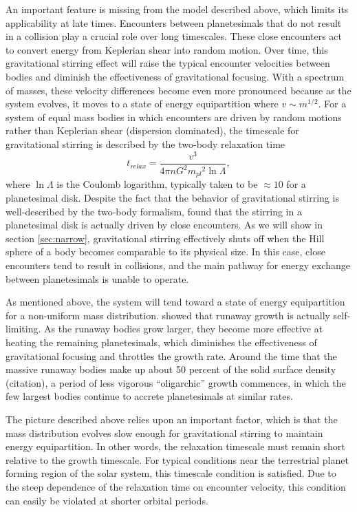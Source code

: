 \documentclass[twocolumn]{aastex63}
\begin{document}
An important feature is missing from the model described above, which
limits its applicability at late times. Encounters between
planetesimals that do not result in a collision play a crucial role
over long timescales. These close encounters act to convert energy
from Keplerian shear into random motion. Over time, this gravitational
stirring effect will raise the typical encounter velocities between
bodies and diminish the effectiveness of gravitational focusing. With
a spectrum of masses, these velocity differences become even more
pronounced because as the system evolves, it moves to a state of
energy equipartition where $v \sim m^{1/2}$. For a system of equal mass bodies in which encounters are driven by random motions rather than Keplerian shear (dispersion dominated), the timescale for gravitational stirring is described by the two-body relaxation time \citep{ida93}
\begin{equation}\label{eq:relax}
	t_{relax} = \frac{v^3}{4 \pi n G^2 {m_{pl}}^2 \ln \Lambda},
\end{equation}
where $\ln \Lambda$ is the Coulomb logarithm,
typically taken to be $\approx 10$ for a planetesimal disk. Despite
the fact that the behavior of gravitational stirring is well-described
by the two-body formalism, \citep{ida93} found that the stirring in a planetesimal disk is actually driven by close encounters. As we will show in section \ref{sec:narrow}, gravitational stirring effectively shuts off when the Hill sphere of a body becomes comparable to its physical size. In this case, close encounters tend to result in collisions, and the main pathway for energy exchange between planetesimals is unable to operate.

As mentioned above, the system will tend toward a state of energy
equipartition for a non-uniform mass distribution. \citet{kokubo98}
showed that runaway growth is actually self-limiting. As the runaway
bodies grow larger, they become more effective at heating the
remaining planetesimals, which diminishes the effectiveness of
gravitational focusing and throttles the growth rate. Around the time
that the massive runaway bodies make up about 50 percent of the solid
surface density
(citation), a period of less vigorous ``oligarchic'' growth commences, in which the few largest bodies continue to accrete planetesimals at similar rates.

The picture described above relies upon an important factor, which is that the mass distribution evolves slow enough for gravitational stirring to maintain energy equipartition. In other words, the relaxation timescale must remain short relative to the growth timescale. For typical conditions near the terrestrial planet forming region of the solar system, this timescale condition is satisfied. Due to the steep dependence of the relaxation time on encounter velocity, this condition can easily be violated at shorter orbital periods.
\end{document}
